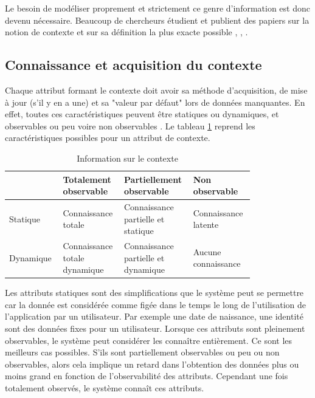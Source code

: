 \documentclass[conference]{./sty/IEEEtran}
\begin{document}
Le besoin de modéliser proprement et strictement ce genre d'information est
donc devenu nécessaire. Beaucoup de chercheurs étudient et publient des papiers
sur la notion de contexte et sur sa définition la plus exacte possible
\cite{DBLP:journals/tlt/VerbertMOWDBD12},
\cite{DBLP:reference/rsh/AdomaviciusT11},
\cite{DBLP:journals/aim/AdomaviciusMRT11}. \\

\subsection{Connaissance et acquisition du contexte}

Chaque attribut formant le contexte doit avoir sa méthode d'acquisition, de
mise à jour (s'il y en a une) et sa "valeur par défaut" lors de données
manquantes. En effet, toutes ces caractéristiques peuvent être statiques ou
dynamiques, et observables ou peu voire non observables
\cite{DBLP:journals/aim/AdomaviciusMRT11}. Le tableau
\ref{tab:update_observability_context} reprend les caractéristiques possibles
pour un attribut de contexte. \\

\begin{table}
  \centering
  \caption{\label{tab:update_observability_context} Information sur le contexte \cite{DBLP:journals/aim/AdomaviciusMRT11}}
  \begin{tabular}{|p{0.20\linewidth}|p{0.20\linewidth}|p{0.20\linewidth}|p{0.20\linewidth}|}
    \hline
    ~ & Totalement observable & Partiellement observable & Non observable \\ \hline
    Statique & Connaissance totale & Connaissance partielle et statique & Connaissance latente \\ \hline
    Dynamique & Connaissance totale dynamique & Connaissance partielle et dynamique & Aucune connaissance \\ \hline
  \end{tabular}
\end{table}

Les attributs statiques sont des simplifications que le système peut se
permettre car la donnée est considérée comme figée dans le temps le long de
l'utilisation de l'application par un utilisateur. Par exemple une date de
naissance, une identité sont des données fixes pour un utilisateur. Lorsque ces
attributs sont pleinement observables, le système peut considérer les connaître
entièrement. Ce sont les meilleurs cas possibles. S'ils sont partiellement
observables ou peu ou non observables, alors cela implique un retard dans
l'obtention des données plus ou moins grand en fonction de l'observabilité des
attributs. Cependant une fois totalement observés, le système connaît ces
attributs. \\
\end{document}
